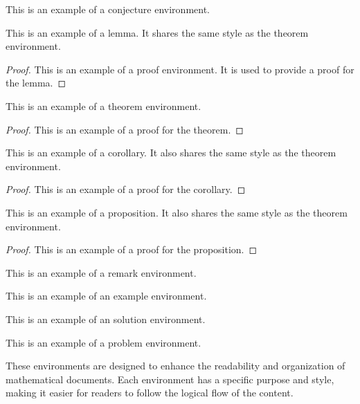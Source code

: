\begin{conjecture}
  This is an example of a conjecture environment.
\end{conjecture}

\begin{lemma}
  This is an example of a lemma. It shares the same style as the theorem environment.
\end{lemma}
\begin{proof}
  This is an example of a proof environment. It is used to provide a proof for the lemma.
\end{proof}

\begin{theorem}
  This is an example of a theorem environment. 
\end{theorem}
\begin{proof}
  This is an example of a proof for the theorem.
\end{proof}

\begin{corollary}
  This is an example of a corollary. It also shares the same style as the theorem environment.
\end{corollary}
\begin{proof}
  This is an example of a proof for the corollary.
\end{proof}

\begin{proposition}
  This is an example of a proposition. It also shares the same style as the theorem environment.
\end{proposition}
\begin{proof}
  This is an example of a proof for the proposition.
\end{proof}

\begin{remark}
  This is an example of a remark environment.
\end{remark}

\begin{example}
  This is an example of an example environment.
\end{example}

\begin{solution}
  This is an example of an solution environment.
\end{solution}

\begin{problem}
  This is an example of a problem environment.
\end{problem}

These environments are designed to enhance the readability and organization of mathematical documents. 
Each environment has a specific purpose and style, making it easier for readers to follow the logical flow of the content.